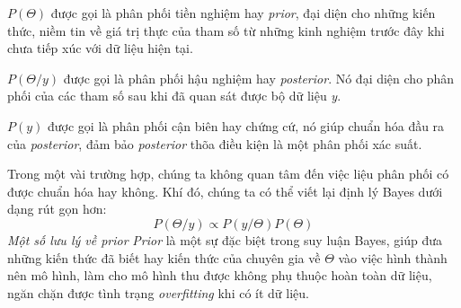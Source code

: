 $P(\Theta)$ được gọi là phân phối tiền nghiệm hay \textit{prior}, đại diện cho những kiến thức, niềm tin về giá trị thực của tham số từ những kinh nghiệm trước đây khi chưa tiếp xúc với dữ liệu hiện tại.

$P(\Theta/y)$ được gọi là phân phối hậu nghiệm hay \textit{posterior}. Nó đại diện cho phân phối của các tham số sau khi đã quan sát được bộ dữ liệu \textit{y}.

$P(y)$ được gọi là phân phối cận biên hay chứng cứ, nó giúp chuẩn hóa đầu ra của \textit{posterior}, đảm bảo \textit{posterior} thõa điều kiện là một phân phối xác suất.

Trong một vài trường hợp, chúng ta không quan tâm đến việc liệu phân phối có được chuẩn hóa hay không. Khí đó, chúng ta có thể viết lại định lý Bayes dưới dạng rút gọn hơn:
\begin{equation}
P(\Theta/y) \propto P(y/\Theta)P(\Theta)
\end{equation}
\textit{Một số lưu lý về prior}
\textit{Prior} là một sự đặc biệt trong suy luận Bayes, giúp đưa những kiến thức đã biết hay kiến thức của chuyên gia về $\Theta$ vào việc hình thành nên mô hình, làm cho mô hình thu được không phụ thuộc hoàn toàn dữ liệu, ngăn chặn được tình trạng \textit{overfitting} khi có ít dữ liệu.

